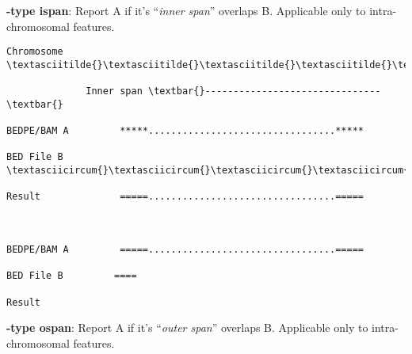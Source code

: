 \documentclass[letterpaper,10pt,english]{sphinxmanual}
\begin{document}
\textbf{-type ispan}: Report A if it's ``\emph{inner span}'' overlaps B. Applicable only to intra-chromosomal features.

\begin{Verbatim}[commandchars=\\\{\}]
Chromosome  \textasciitilde{}\textasciitilde{}\textasciitilde{}\textasciitilde{}\textasciitilde{}\textasciitilde{}\textasciitilde{}\textasciitilde{}\textasciitilde{}\textasciitilde{}\textasciitilde{}\textasciitilde{}\textasciitilde{}\textasciitilde{}\textasciitilde{}\textasciitilde{}\textasciitilde{}\textasciitilde{}\textasciitilde{}\textasciitilde{}\textasciitilde{}\textasciitilde{}\textasciitilde{}\textasciitilde{}\textasciitilde{}\textasciitilde{}\textasciitilde{}\textasciitilde{}\textasciitilde{}\textasciitilde{}\textasciitilde{}\textasciitilde{}\textasciitilde{}\textasciitilde{}\textasciitilde{}\textasciitilde{}\textasciitilde{}\textasciitilde{}\textasciitilde{}\textasciitilde{}\textasciitilde{}\textasciitilde{}\textasciitilde{}\textasciitilde{}\textasciitilde{}\textasciitilde{}\textasciitilde{}\textasciitilde{}\textasciitilde{}\textasciitilde{}\textasciitilde{}\textasciitilde{}\textasciitilde{}\textasciitilde{}\textasciitilde{}\textasciitilde{}\textasciitilde{}\textasciitilde{}\textasciitilde{}\textasciitilde{}\textasciitilde{}\textasciitilde{}\textasciitilde{}\textasciitilde{}

              Inner span \textbar{}-------------------------------\textbar{}

BEDPE/BAM A         *****.................................*****

BED File B                         \textasciicircum{}\textasciicircum{}\textasciicircum{}\textasciicircum{}\textasciicircum{}\textasciicircum{}\textasciicircum{}\textasciicircum{}

Result              =====.................................=====



BEDPE/BAM A         =====.................................=====

BED File B         ====

Result
\end{Verbatim}

\textbf{-type ospan}: Report A if it's ``\emph{outer span}'' overlaps B. Applicable only to intra-chromosomal features.
\end{document}
